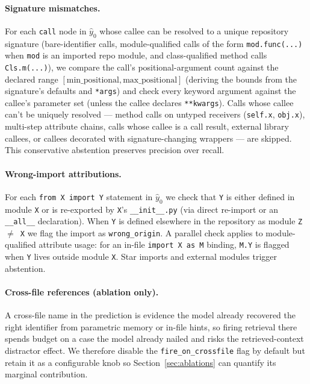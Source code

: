 \documentclass[10pt,twocolumn]{article}
\begin{document}
\paragraph{Signature mismatches.} For each \texttt{call} node in
$\hat{y}_0$ whose callee can be resolved to a unique repository signature
(bare-identifier calls, module-qualified calls of the form
\texttt{mod.func(...)} when \texttt{mod} is an imported repo module, and
class-qualified method calls \texttt{Cls.m(...)}), we compare the call's
positional-argument count against the declared range
$[\text{min\_positional}, \text{max\_positional}]$ (deriving the bounds
from the signature's defaults and \texttt{*args}) and check every keyword
argument against the callee's parameter set (unless the callee declares
\texttt{**kwargs}). Calls whose callee can't be uniquely resolved
--- method calls on untyped receivers (\texttt{self.x}, \texttt{obj.x}),
multi-step attribute chains, calls whose callee is a call result,
external library callees, or callees decorated with signature-changing
wrappers --- are skipped. This conservative abstention preserves
precision over recall.

\paragraph{Wrong-import attributions.} For each
\texttt{from X import Y} statement in $\hat{y}_0$ we check that
\texttt{Y} is either defined in module \texttt{X} or is re-exported by
\texttt{X}'s \texttt{\_\_init\_\_.py} (via direct re-import or an
\texttt{\_\_all\_\_} declaration). When \texttt{Y} is defined elsewhere
in the repository as module \texttt{Z $\neq$ X} we flag the import as
\texttt{wrong\_origin}. A parallel check applies to module-qualified
attribute usage: for an in-file \texttt{import X as M} binding,
\texttt{M.Y} is flagged when \texttt{Y} lives outside module \texttt{X}.
Star imports and external modules trigger abstention.

\paragraph{Cross-file references (ablation only).} A cross-file name
in the prediction is evidence the model already recovered the right
identifier from parametric memory or in-file hints, so firing retrieval
there spends budget on a case the model already nailed and risks the
retrieved-context distractor effect. We therefore disable the
\texttt{fire\_on\_crossfile} flag by default but retain it as a
configurable knob so Section~\ref{sec:ablations} can quantify its
marginal contribution.
\end{document}
